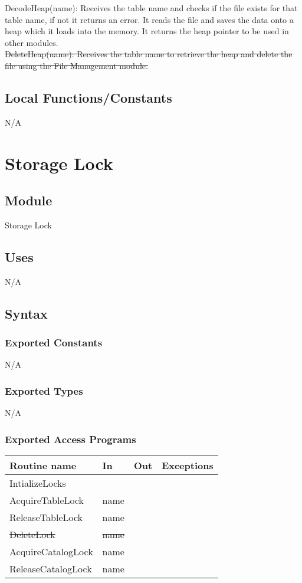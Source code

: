 \documentclass[12pt]{article}
\begin{document}
\noindent DecodeHeap(name): Receives the table name and checks if the file exists for that table name, if not it returns an error. It reads the file and saves the data onto a heap which it loads into the memory. It returns the heap pointer to be used in other modules. \\ 

\noindent \sout{DeleteHeap(name): Receives the table name to retrieve the heap and delete the file using the File Management module.} \\

\subsection{Local Functions/Constants}
N/A

\newpage

\section{Storage Lock}

\subsection{Module}
Storage Lock

\subsection{Uses}
N/A

\subsection{Syntax}
\subsubsection{Exported Constants}
N/A

\subsubsection{Exported Types}
N/A

\subsubsection{Exported Access Programs}
\begin{tabular}{| l | l | l | l |}
\hline
\textbf{Routine name} & \textbf{In} & \textbf{Out} & \textbf{Exceptions}\\
\hline
{\color{red} IntializeLocks} & & & \\
\hline
{\color{red} AcquireTableLock} & name &  & \\
\hline
{\color{red} ReleaseTableLock} & name &  & \\
\hline
\sout{DeleteLock} & \sout{name} &  & \\
\hline
{\color{red} AcquireCatalogLock} & name &  & \\
\hline
{\color{red} ReleaseCatalogLock} & name &  & \\
\hline
\end{tabular}
\end{document}
